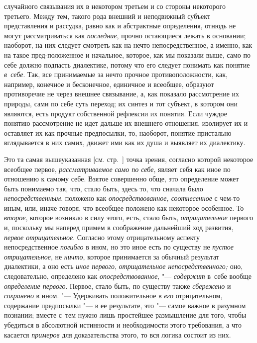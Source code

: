 случайного связывания их в некотором третьем и со стороны некоторого
третьего. Между тем, такого рода внешний и неподвижный субъект
представления и рассудка, равно как и абстрактные определения, отнюдь не
могут рассматриваться как {\em последние}, прочно
остающиеся лежать в основании; наоборот, на них следует
смотреть как на нечто непосредственное, а именно, как на такое
пред-положенное и начальное, которое, как мы показали выше, само по себе
должно подпасть диалектике, потому что его следует понимать как понятие
{\em в~себе}. Так, все
принимаемые за нечто прочное противоположности, как, например, конечное и
бесконечное, единичное и всеобщее, образуют противоречие не через внешнее
связывание, а, как показало рассмотрение их природы, сами по себе суть
переход; их синтез и тот субъект, в котором они являются, есть продукт
собственной рефлексии их понятия. Если чуждое понятию рассмотрение не идет
дальше их внешнего отношения, изолирует их и оставляет их как прочные
предпосылки, то, наоборот, понятие пристально вглядывается в них самих,
движет ими как их душа и выявляет их диалектику.

Это та самая вышеуказанная [см. стр.~\pageref{bkm:bmpg224a}]
точка зрения, согласно которой некоторое всеобщее первое,
{\em рассматриваемое} {\em само по себе}, являет
себя как иное по отношению к самому себе. Взятое совершенно обще, это
определение может быть понимаемо так, что, стало быть, здесь то, что
сначала было {\em непосредственным},
положено как {\em опосредствованное, соотнесенное} с
чем-то иным, или, иначе говоря, что всеобщее положено как некоторое
особенное. То {\em второе},
которое возникло в силу этого, есть, стало быть, {\em отрицательное}
первого и, поскольку мы наперед примем в соображение
дальнейший ход развития, {\em первое
отрицательное}. Согласно этому отрицательному аспекту
непосредственное {\em погибло}
в ином, но это иное есть по существу не
{\em пустое отрицательное}, не {\em ничто},
которое принимается за обычный результат диалектики, а оно
есть {\em иное первого},
{\em отрицательное непосредственного;} оно, следовательно, определено как
{\em опосредствованное}, "--- {\em содержит} в~себе
вообще {\em определение первого}. Первое, стало быть, по существу также
{\em сбережено} и {\em сохранено} в ином. "--- Удерживать положительное в
{\em его} отрицательном, содержание предпосылки "--- в ее
результате,
это "--- самое важное в разумном познании; вместе
с~тем нужно лишь простейшее размышление для того, чтобы убедиться в
абсолютной истинности и необходимости этого требования, а что касается
{\em примеров} для доказательства этого, то вся логика состоит из них.


